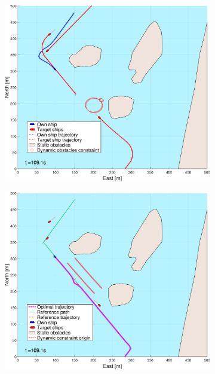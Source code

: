 \begin{figure}[!ht]
\begin{subfigure}[b]{0.494\textwidth}
        \subcaption{}
    \end{subfigure}
    \hfill
    \\
    \begin{subfigure}[b]{0.494\textwidth}
        \centering
        \includegraphics[width=\textwidth]{Images/NewFigures/Helloya_Rev/_Simple_0fig1_time=110}
        \subcaption{}
    \end{subfigure}
    \hfill
    \begin{subfigure}[b]{0.494\textwidth}
        \centering
        \includegraphics[width=\textwidth]{Images/NewFigures/Helloya_Rev/_Simple_0fig999_time=110}
        \subcaption{}
    \end{subfigure}
    \hfill
    \label{FIG: Helloya rev full prediction}
\end{figure}%
